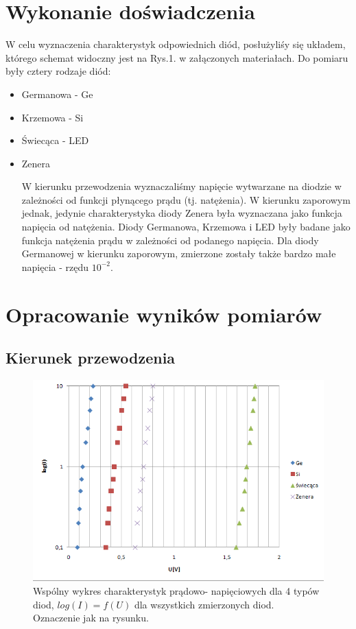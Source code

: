 \documentclass[11pt]{article}
\begin{document}
\section{Wykonanie doświadczenia}
W celu wyznaczenia charakterystyk odpowiednich diód, posłużyliśy się układem, którego schemat widoczny jest na Rys.1. w załączonych materiałach. Do pomiaru były cztery rodzaje diód:
\begin{itemize}
    \item{Germanowa - Ge}
    \item{Krzemowa - Si}
    \item{Świecąca - LED}
    \item{Zenera}

W kierunku przewodzenia wyznaczaliśmy napięcie wytwarzane na diodzie w zależności od funkcji płynącego prądu (tj. natężenia).
W kierunku zaporowym jednak, jedynie charakterystyka diody Zenera była wyznaczana jako funkcja napięcia od natężenia. Diody Germanowa, Krzemowa i LED były badane jako funkcja natężenia prądu w zależności od podanego napięcia. Dla diody Germanowej w kierunku zaporowym, zmierzone zostały także bardzo małe napięcia - rzędu $10^{-2}$.
\end{itemize}
\section{Opracowanie wyników pomiarów}
\subsection{Kierunek przewodzenia}
\begin{figure}[H]
    \centering
    \includegraphics[height=0.27\paperheight]{graph1}
    \caption{ Wspólny  wykres  charakterystyk  prądowo-
napięciowych dla 4 typów diod,  $log(I) = f(U)$  dla  wszystkich  zmierzonych  diod. Oznaczenie jak na rysunku. }
    \label{fig:graph3}
\end{figure}
\end{document}
